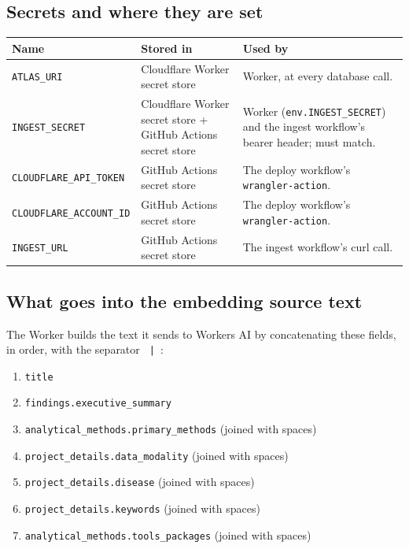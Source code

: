 \documentclass[11pt,a4paper]{article}
\begin{document}
\subsection{Secrets and where they are set}

\begin{center}
\begin{tabularx}{\textwidth}{l l X}
\toprule
\textbf{Name} & \textbf{Stored in} & \textbf{Used by} \\
\midrule
\texttt{ATLAS\_URI} & Cloudflare Worker secret store & Worker, at every database call. \\
\texttt{INGEST\_SECRET} & Cloudflare Worker secret store + GitHub Actions secret store & Worker (\texttt{env.INGEST\_SECRET}) and the ingest workflow's bearer header; must match. \\
\texttt{CLOUDFLARE\_API\_TOKEN} & GitHub Actions secret store & The deploy workflow's \texttt{wrangler-action}. \\
\texttt{CLOUDFLARE\_ACCOUNT\_ID} & GitHub Actions secret store & The deploy workflow's \texttt{wrangler-action}. \\
\texttt{INGEST\_URL} & GitHub Actions secret store & The ingest workflow's curl call. \\
\bottomrule
\end{tabularx}
\end{center}

\subsection{What goes into the embedding source text}

The Worker builds the text it sends to Workers AI by concatenating these fields, in order, with the separator \texttt{ | }:

\begin{enumerate}[leftmargin=1.5em,itemsep=2pt]
  \item \texttt{title}
  \item \texttt{findings.executive\_summary}
  \item \texttt{analytical\_methods.primary\_methods} (joined with spaces)
  \item \texttt{project\_details.data\_modality} (joined with spaces)
  \item \texttt{project_details.disease} (joined with spaces)
  \item \texttt{project\_details.keywords} (joined with spaces)
  \item \texttt{analytical\_methods.tools\_packages} (joined with spaces)
\end{enumerate}
\end{document}
